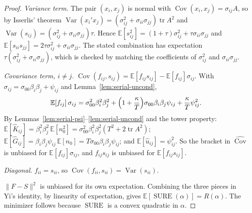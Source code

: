 \begin{proof}
\emph{Variance term.} The pair $(x_i, x_j)$ is normal with $\operatorname{Cov}(x_i, x_j) = \sigma_{ij}A$, so by Isserlis' theorem $\operatorname{Var}(x_i'x_j) = (\sigma_{ij}^2 + \sigma_{ii}\sigma_{jj})\operatorname{tr}A^2$ and $\operatorname{Var}(s_{ij}) = (\sigma_{ij}^2 + \sigma_{ii}\sigma_{jj})\tau$. Hence $\mathbb{E}[s_{ij}^2] = (1 + \tau)\sigma_{ij}^2 + \tau\sigma_{ii}\sigma_{jj}$ and $\mathbb{E}[s_{ii}s_{jj}] = 2\tau\sigma_{ij}^2 + \sigma_{ii}\sigma_{jj}$. The stated combination has expectation $\tau(\sigma_{ij}^2 + \sigma_{ii}\sigma_{jj})$, which is checked by matching the coefficients of $\sigma_{ij}^2$ and $\sigma_{ii}\sigma_{jj}$.

\emph{Covariance term, $i \neq j$.} $\operatorname{Cov}(f_{ij}, s_{ij}) = \mathbb{E}[f_{ij}s_{ij}] - \mathbb{E}[f_{ij}]\sigma_{ij}$. With $\sigma_{ij} = \sigma_{00}\beta_i\beta_j + \psi_{ij}$ and Lemma~\ref{lem:serial-uncond},
\[
  \mathbb{E}[f_{ij}]\,\sigma_{ij} = \sigma_{00}^2\beta_i^2\beta_j^2 + \Bigl(1 + \frac{\kappa}{T}\Bigr)\sigma_{00}\beta_i\beta_j\psi_{ij} + \frac{\kappa}{T}\psi_{ij}^2.
\]
By Lemmas~\ref{lem:serial-psi}--\ref{lem:serial-uncond} and the tower property: $\mathbb{E}[\hat K_{ij}] = \beta_i^2\beta_j^2\,\mathbb{E}[n_0^2] = \sigma_{00}^2\beta_i^2\beta_j^2(T^2 + 2\operatorname{tr}A^2)$; $\mathbb{E}[\hat G_{ij}] = \beta_i\beta_j\psi_{ij}\,\mathbb{E}[n_0] = T\sigma_{00}\beta_i\beta_j\psi_{ij}$; and $\mathbb{E}[\hat u_{ij}] = \psi_{ij}^2$. So the bracket in $\widehat{\operatorname{Cov}}$ is unbiased for $\mathbb{E}[f_{ij}]\sigma_{ij}$, and $f_{ij}s_{ij}$ is unbiased for $\mathbb{E}[f_{ij}s_{ij}]$.

\emph{Diagonal.} $f_{ii} = s_{ii}$, so $\operatorname{Cov}(f_{ii}, s_{ii}) = \operatorname{Var}(s_{ii})$.

$\|F - S\|^2$ is unbiased for its own expectation. Combining the three pieces in Yi's identity, by linearity of expectation, gives $\mathbb{E}[\operatorname{SURE}(\alpha)] = R(\alpha)$. The minimizer follows because $\operatorname{SURE}$ is a convex quadratic in $\alpha$.
\end{proof}

